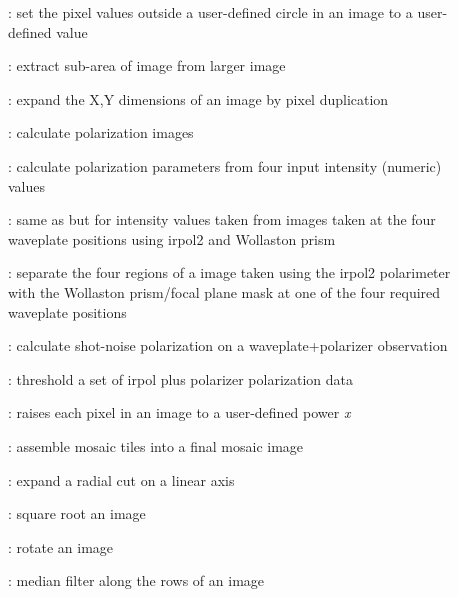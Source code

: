\begin{description}
\item []: set the pixel values outside a
user-defined circle in an image to a user-defined value

\item []: extract sub-area of image from larger image

\item []: expand the X,Y dimensions of an
image by pixel duplication

\item []: calculate polarization images

\item []: calculate polarization parameters from
four input intensity (numeric) values

\item []: same as {\bf {}}
but for intensity values taken from images taken at the four waveplate
positions using {\sc irpol2} and Wollaston prism

\item []: separate the four regions of a image
taken using the {\sc irpol2} polarimeter with the Wollaston prism/focal plane
mask at one of the four required waveplate positions

\item []: calculate shot-noise polarization
on a waveplate+polarizer observation

\item []: threshold a set of
{\sc irpol} plus polarizer polarization data

\item []: raises each pixel in an image to a
user-defined power {\it x}

\item []: assemble mosaic tiles into a final mosaic image

\item []: expand a radial cut on a linear axis

\item []: square root an image

\item []: rotate an image

\item []: median filter along the rows of an image


\end{description}
